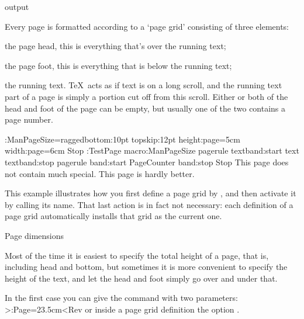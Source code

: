 %
%
%
%
%
%
 output

Every page is formatted according to a `page grid' consisting of
three elements:

\Enumerate \item the page head, this is everything that's over the
running text;
\item the page foot, this is everything that is below the running
text;
\item the running text. \TeX\ acts as if text is on a long scroll,
and the running text part of a page is simply a portion cut off from
this scroll.\>
Either or both of the head and foot of the page can be empty, but
usually one of the two contains a page number.

\OutExample
\OptionsMacro:ManPageSize=raggedbottom:10pt topskip:12pt
 height:page=5cm width:page=6cm Stop
\DefinePageGrid:TestPage macro:ManPageSize
 pagerule textband:start text textband:stop
 pagerule band:start PageCounter band:stop Stop
\TestPage 
This page does not contain much special.\EjectPage
This page is hardly better.
\OutExampleStop

This example illustrates how you first define a page grid by
, and then activate it by calling its name. That
last action is in fact not necessary: each definition of a page grid
automatically installs that grid as the current one.

\Section Page dimensions

Most of the time it is easiest to specify the total height of a page,
that is, including head and bottom, but sometimes it is more
convenient to specify the height of the text, and let the head and
foot simply go over and under that.

In the first case you can give the command  with
two parameters:
\Ver>\Height:Page=23.5cm<Rev or inside a page grid definition the
option .

